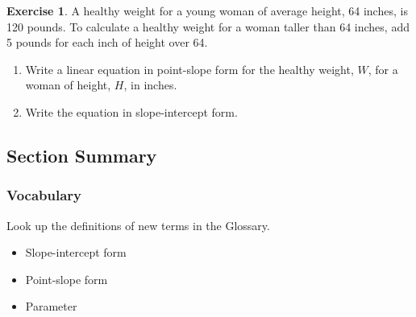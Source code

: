 \documentclass[10pt,]{book}
\theoremstyle{plain}
\theoremstyle{definition}
\theoremstyle{definition}
\theoremstyle{definition}
\theoremstyle{definition}
\newtheorem{exercise}[theorem]{Exercise}
\numberwithin{equation}{part}
\begin{document}
\begin{exercise}\label{exercise-healthy-weight}
A healthy weight for a young woman of average height, 64 inches, is 120 pounds. To calculate a healthy weight for a woman taller than 64 inches, add 5 pounds for each inch of height over 64. \leavevmode%
\begin{enumerate}[label=*\alph**]
\item\hypertarget{li-1123}{}Write a linear equation in point-slope form for the healthy weight, \(W\), for a woman of height, \(H\), in inches.%
\item\hypertarget{li-1124}{}Write the equation in slope-intercept form.%
\end{enumerate}
%
\end{exercise}
\typeout{************************************************}
\typeout{************************************************}
\subsection[{Section Summary}]{Section Summary}\label{summary-1-5}
\typeout{************************************************}
\typeout{************************************************}
\subsubsection[{Vocabulary}]{Vocabulary}\label{subsubsection-17}
Look up the definitions of new terms in the Glossary. \leavevmode%
\begin{multicols}{3}
\begin{itemize}[label=\textbullet]
\item{}Slope-intercept form%
\item{}Point-slope form%
\item{}Parameter%
\end{itemize}
\end{multicols}
%
\typeout{************************************************}
\typeout{************************************************}
\end{document}

